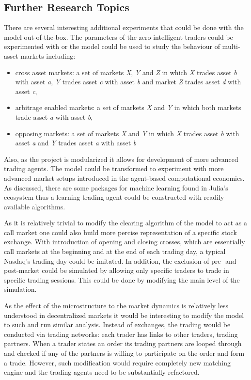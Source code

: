 \subsection{Further Research Topics}
There are several interesting additional experiments that could be done with
the model out-of-the-box. The parameters of the zero intelligent traders could
be experimented with or the model could be used to study the behaviour of 
multi-asset markets including:
\begin{itemize}
    \item cross asset markets: a set of markets \emph{X}, \emph{Y} and \emph{Z} 
        in which \emph{X} trades asset \emph{b} with asset \emph{a}, 
        \emph{Y} trades asset \emph{c} with asset \emph{b} 
        and market \emph{Z} trades asset \emph{d} with asset \emph{c},
    \item arbitrage enabled markets: a set of markets \emph{X} and \emph{Y} 
        in which both markets trade asset \emph{a} with asset \emph{b},
    \item opposing markets: a set of markets \emph{X} and \emph{Y} 
        in which \emph{X} trades asset \emph{b} with asset \emph{a} 
        and \emph{Y} trades asset \emph{a} with asset \emph{b}
\end{itemize}

Also, as the project is modularized it allows for development of more advanced
trading agents. The model could be transformed to experiment with more advanced
market setups introduced in the agent-based computational economics. As discussed,
there are some packages for machine learning found in Julia's ecosystem thus 
a learning trading agent could be constructed with readily available algorithms.

As it is relatively trivial to modify the clearing algorithm of the model to 
act as a call market one could also build more percise representation of a
specific stock exchange. With introduction of opening and closing crosses,
which are essentially call markets at the beginning and at the end of each 
trading day, a typical Nasdaq's trading day could be imitated. In addition,
the exclusion of pre- and post-market could be simulated by allowing only
specific traders to trade in specific trading sessions. This could be done
by modifying the main level of the simulation. 

As the effect of the microstructure to the market dynamics is relatively 
less understood in decentralized markets it would be interesting to modify 
the model to such and run similar analysis. Instead of exchanges, the trading 
would be conducted via trading networks: each trader has links to other traders, 
trading partners. When a trader states an order its trading partners are 
looped through and checked if any of the partners is willing to participate 
on the order and form a trade. However, such modification would require 
completely new matching engine and the trading agents need to be substantially 
refactored.

